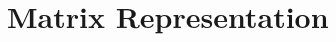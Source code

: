 \documentclass[../fem.tex]{subfile}
\begin{document}
\section{Matrix Representation}%
\label{sec:matrix_representation}
\end{document}
